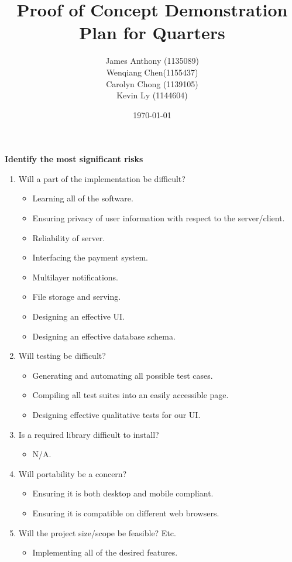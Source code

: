 \documentclass[12pt]{article}
\begin{document}
\title{Proof of Concept Demonstration Plan for Quarters} 
\author{James Anthony (1135089)\\ Wenqiang Chen(1155437)\\ Carolyn Chong 
(1139105)\\ Kevin Ly (1144604)}
\date{\today}
\maketitle

\pagebreak

\textbf{Identify the most significant risks}
\begin{enumerate}

\item Will a part of the implementation be difficult?
\begin{itemize}
\item Learning all of the software.
\item Ensuring privacy of user information with respect to the server/client.
\item Reliability of server.
\item Interfacing the payment system.
\item Multilayer notifications.
\item File storage and serving.
\item Designing an effective UI.
\item Designing an effective database schema.
\end{itemize}

\item Will testing be difficult?
\begin{itemize}
\item Generating and automating all possible test cases.
\item Compiling all test suites into an easily accessible page.
\item Designing effective qualitative tests for our UI.
\end{itemize}

\item Is a required library difficult to install?
\begin{itemize}
\item N/A.
\end{itemize}

\item Will portability be a concern?
\begin{itemize}
\item Ensuring it is both desktop and mobile compliant.
\item Ensuring it is compatible on different web browsers.
\end{itemize}

\item Will the project size/scope be feasible? Etc.
\begin{itemize}
\item Implementing all of the desired features. \\
\end{itemize}

\end{enumerate}
\end{document}
